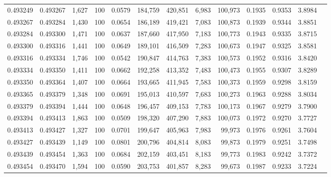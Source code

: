 \begin{tabular}{rrrrrrrrrrrrr}
0.493249 & 0.493267 & 1,627 & 100 &                                     0.0579 & 184,759 & 420,851 &   6,983 & 100,973 & 0.1935 & 0.9353 & 3.8984 \\
0.493267 & 0.493284 & 1,430 & 100 &                                     0.0654 & 186,189 & 419,421 &   7,083 & 100,873 & 0.1939 & 0.9344 & 3.8851 \\
0.493284 & 0.493300 & 1,471 & 100 &                                     0.0637 & 187,660 & 417,950 &   7,183 & 100,773 & 0.1943 & 0.9335 & 3.8715 \\
0.493300 & 0.493316 & 1,441 & 100 &                                     0.0649 & 189,101 & 416,509 &   7,283 & 100,673 & 0.1947 & 0.9325 & 3.8581 \\
0.493316 & 0.493334 & 1,746 & 100 &                                     0.0542 & 190,847 & 414,763 &   7,383 & 100,573 & 0.1952 & 0.9316 & 3.8420 \\
0.493334 & 0.493350 & 1,411 & 100 &                                     0.0662 & 192,258 & 413,352 &   7,483 & 100,473 & 0.1955 & 0.9307 & 3.8289 \\
0.493350 & 0.493364 & 1,407 & 100 &                                     0.0664 & 193,665 & 411,945 &   7,583 & 100,373 & 0.1959 & 0.9298 & 3.8159 \\
0.493365 & 0.493379 & 1,348 & 100 &                                     0.0691 & 195,013 & 410,597 &   7,683 & 100,273 & 0.1963 & 0.9288 & 3.8034 \\
0.493379 & 0.493394 & 1,444 & 100 &                                     0.0648 & 196,457 & 409,153 &   7,783 & 100,173 & 0.1967 & 0.9279 & 3.7900 \\
0.493394 & 0.493413 & 1,863 & 100 &                                     0.0509 & 198,320 & 407,290 &   7,883 & 100,073 & 0.1972 & 0.9270 & 3.7727 \\
0.493413 & 0.493427 & 1,327 & 100 &                                     0.0701 & 199,647 & 405,963 &   7,983 &  99,973 & 0.1976 & 0.9261 & 3.7604 \\
0.493427 & 0.493439 & 1,149 & 100 &                                     0.0801 & 200,796 & 404,814 &   8,083 &  99,873 & 0.1979 & 0.9251 & 3.7498 \\
0.493439 & 0.493454 & 1,363 & 100 &                                     0.0684 & 202,159 & 403,451 &   8,183 &  99,773 & 0.1983 & 0.9242 & 3.7372 \\
0.493454 & 0.493470 & 1,594 & 100 &                                     0.0590 & 203,753 & 401,857 &   8,283 &  99,673 & 0.1987 & 0.9233 & 3.7224 \\

\end{tabular}

